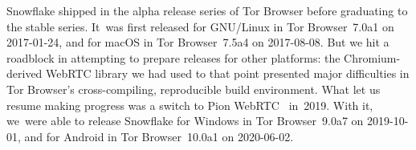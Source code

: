 \documentclass[letterpaper,twocolumn]{article}
\begin{document}
Snowflake shipped in the alpha release series of Tor Browser
before graduating to the stable series.
It~was first released for GNU/Linux
in Tor Browser~7.0a1 on \mbox{2017-01-24},
and for macOS
in Tor Browser~7.5a4 on \mbox{2017-08-08}.
But we hit a roadblock in attempting to prepare releases for other platforms:
the Chromium-derived WebRTC library we had used to that point
presented major difficulties
in Tor Browser's
cross-compiling, reproducible build environment.
What let us resume making progress was a switch to
Pion WebRTC~\cite{pion-webrtc} in~2019.
With it, we~were able to release
Snowflake for Windows
in Tor Browser~9.0a7 on \mbox{2019-10-01},
and for Android in
Tor Browser~10.0a1 on \mbox{2020-06-02}.
\end{document}
